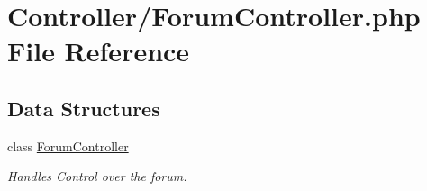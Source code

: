 \hypertarget{_forum_controller_8php}{}\section{Controller/\+Forum\+Controller.php File Reference}
\label{_forum_controller_8php}
\subsection*{Data Structures}
\begin{DoxyCompactItemize}
\item 
class \hyperlink{class_forum_controller}{Forum\+Controller}
\begin{DoxyCompactList}\small\item\em Handles Control over the forum. \end{DoxyCompactList}\end{DoxyCompactItemize}
